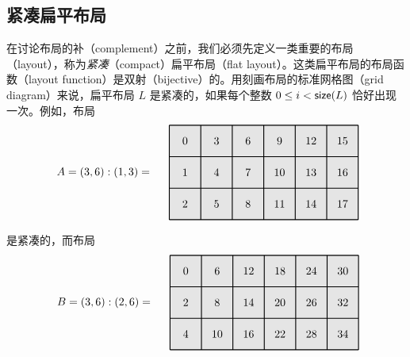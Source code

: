 \subsection{紧凑扁平布局}

在讨论布局的补（complement）之前，我们必须先定义一类重要的布局（layout），称为{\it 紧凑}（compact）扁平布局（flat layout）。这类扁平布局的布局函数（layout function）是双射（bijective）的。用刻画布局的标准网格图（grid diagram）来说，扁平布局 $L$ 是紧凑的，如果每个整数 $0 \leq i< \mathsf{size}(L)$ 恰好出现一次。例如，布局
\[
\begin{tikzpicture}[x={(0cm,-1cm)},y={(1cm,0cm)},every node/.style={minimum size=1cm, outer sep=0pt}]

\node[fill=gray!20] at (0,0) {0};
\node[fill=gray!20] at (0,1) {3};
\node[fill=gray!20] at (0,2) {6};
\node[fill=gray!20] at (0,3) {9};
\node[fill=gray!20] at (0,4) {12};
\node[fill=gray!20] at (0,5) {15};
\node[fill=gray!20] at (1,0) {1};
\node[fill=gray!20] at (1,1) {4};
\node[fill=gray!20] at (1,2) {7};
\node[fill=gray!20] at (1,3) {10};
\node[fill=gray!20] at (1,4) {13};
\node[fill=gray!20] at (1,5) {16};
\node[fill=gray!20] at (2,0) {2};
\node[fill=gray!20] at (2,1) {5};
\node[fill=gray!20] at (2,2) {8};
\node[fill=gray!20] at (2,3) {11};
\node[fill=gray!20] at (2,4) {14};
\node[fill=gray!20] at (2,5) {17};
\draw[color=black,thick,shift={(-0.5,-0.5)}] (0,0) grid (3,6);

\node[anchor = east] at (1,-1) {$A = (3,6):(1,3) = $};
\end{tikzpicture}
\]
是紧凑的，而布局
\[
\begin{tikzpicture}[x={(0cm,-1cm)},y={(1cm,0cm)},every node/.style={minimum size=1cm, outer sep=0pt}]

\node[fill=gray!20] at (0,0) {0};
\node[fill=gray!20] at (0,1) {6};
\node[fill=gray!20] at (0,2) {12};
\node[fill=gray!20] at (0,3) {18};
\node[fill=gray!20] at (0,4) {24};
\node[fill=gray!20] at (0,5) {30};
\node[fill=gray!20] at (1,0) {2};
\node[fill=gray!20] at (1,1) {8};
\node[fill=gray!20] at (1,2) {14};
\node[fill=gray!20] at (1,3) {20};
\node[fill=gray!20] at (1,4) {26};
\node[fill=gray!20] at (1,5) {32};
\node[fill=gray!20] at (2,0) {4};
\node[fill=gray!20] at (2,1) {10};
\node[fill=gray!20] at (2,2) {16};
\node[fill=gray!20] at (2,3) {22};
\node[fill=gray!20] at (2,4) {28};
\node[fill=gray!20] at (2,5) {34};
\draw[color=black,thick,shift={(-0.5,-0.5)}] (0,0) grid (3,6);

\node[anchor = east] at (1,-1) {$B = (3,6):(2,6) = $};
\end{tikzpicture}
\]
